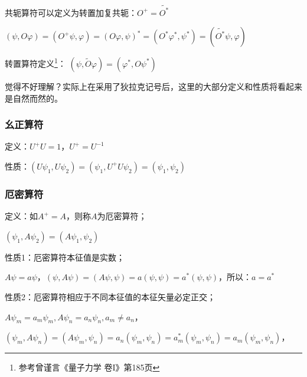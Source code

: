 共轭算符可以定义为转置加复共轭：$O^ +   = \widetilde{O^* }$


\begin{center}
$\left( {\psi ,O\varphi } \right) = \left( {O^ +  \psi ,\varphi } \right) = \left( {O\varphi ,\psi } \right)^*  = \left( {O^* \varphi ^* ,\psi ^* } \right) = \left( {\widetilde{O^* }\psi ,\varphi } \right)$
\end{center}

转置算符定义\footnote{参考曾谨言《量子力学 卷I》第185页}：
$\left( {\psi ,\tilde O\varphi } \right) = \left( {\varphi ^* ,O\psi ^* } \right)$

觉得不好理解？实际上在采用了狄拉克记号后，这里的大部分定义和性质将看起来是自然而然的。

\subsubsection{幺正算符}

定义：$U^ +  U = 1$，$U^ +   = U^{ - 1} $

性质：$\left( {U\psi _1 ,U\psi _2 } \right) = \left( {\psi _1 ,U^ +  U\psi _2 } \right) = \left( {\psi _1 ,\psi _2 } \right)$

\subsubsection{厄密算符}

定义：如$A^ +   = A$，则称$A$为厄密算符；


\begin{center}
$\left( {\psi _1 ,A\psi _2 } \right) = \left( {A\psi _1 ,\psi _2 } \right)$
\end{center}

性质1：厄密算符本征值是实数；

$A\psi  = a\psi $，$\left( {\psi ,A\psi } \right) = \left( {A\psi ,\psi } \right) = a\left( {\psi ,\psi } \right) = a^* \left( {\psi ,\psi } \right)$，所以：$a = a^* $

性质2：厄密算符相应于不同本征值的本征矢量必定正交；

$A\psi _m  = a_m \psi _m ,A\psi _n  = a_n \psi _n ,a_m  \ne a_n $，

$\left( {\psi _m ,A\psi _n } \right) = \left( {A\psi _m ,\psi _n } \right) = a_n \left( {\psi _m ,\psi _n } \right) = a_m ^* \left( {\psi _m ,\psi _n } \right) = a_m \left( {\psi _m ,\psi _n } \right)$，

